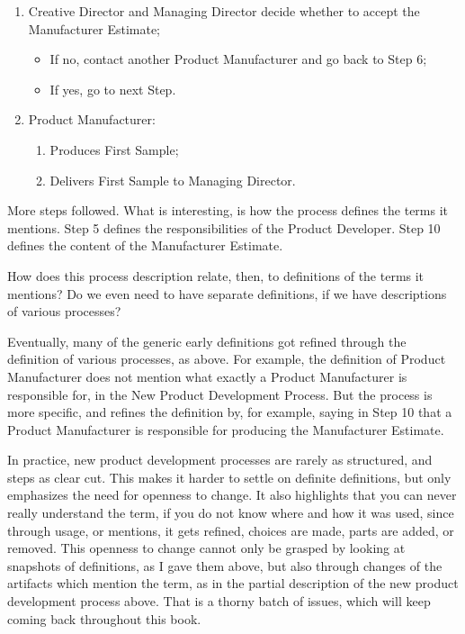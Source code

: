 \documentclass[graybox,envcountchap,sectrefs]{svmono}
\newcommand{\nterm}[1]{\textsf{#1}}
\begin{document}
{\begin{enumerate}
\begin{enumerate}
			\item Minimal order size;
			\item Estimated unit cost.
		\end{enumerate}
	\item Creative Director and Managing Director decide whether to accept the Manufacturer Estimate; 
		\begin{itemize}
			\item If no, contact another Product Manufacturer and go back to Step 6;
			\item If yes, go to next Step.
		\end{itemize}
	\item Product Manufacturer:
		\begin{enumerate}
			\item Produces First Sample;
			\item Delivers First Sample to Managing Director.
		\end{enumerate}
\end{enumerate}
}

More steps followed. What is interesting, is how the process defines the terms it mentions. Step 5 defines the responsibilities of the \nterm{Product Developer}. Step 10 defines the content of the \nterm{Manufacturer Estimate}.

How does this process description relate, then, to definitions of the terms it mentions? Do we even need to have separate definitions, if we have descriptions of various processes? 

Eventually, many of the generic early definitions got refined through the definition of various processes, as above. For example, the definition of \nterm{Product Manufacturer} does not mention what exactly a \nterm{Product Manufacturer} is responsible for, in the \nterm{New Product Development Process}. But the process is more specific, and refines the definition by, for example, saying in Step 10 that a \nterm{Product Manufacturer} is responsible for producing the \nterm{Manufacturer Estimate}. 

In practice, new product development processes are rarely as structured, and steps as clear cut.  This makes it harder to settle on definite definitions, but only emphasizes the need for openness to change. It also highlights that you can never really understand the term, if you do not know where and how it was used, since through usage, or mentions, it gets refined, choices are made, parts are added, or removed. This openness to change cannot only be grasped by looking at snapshots of definitions, as I gave them above, but also through changes of the artifacts which mention the term, as in the partial description of the new product development process above. That is a thorny batch of issues, which will keep coming back throughout this book.
\end{document}
